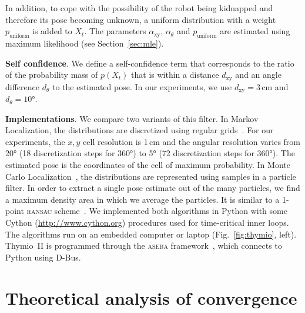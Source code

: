 \documentclass{svmult}
\newcommand{\fig}[1]{Fig.~\ref{fig:#1}}
\newcommand{\sect}[1]{Section~\ref{sec:#1}}
\begin{document}
In addition, to cope with the possibility of the robot being kidnapped and therefore its pose becoming unknown, a uniform distribution with a weight $p_\mathrm{uniform}$ is added to $X_t$.
The parameters $\alpha_\mathrm{xy}$, $\alpha_\theta$ and $p_\mathrm{uniform}$ are estimated using maximum likelihood (see \sect{mle}).


\textbf{Self confidence}. We define a self-confidence term that corresponds to the ratio of the probability mass of $p(X_t)$ that is within a distance $d_\mathrm{xy}$ and an angle difference $d_\theta$ to the estimated pose.
In our experiments, we use $d_\mathrm{xy} = 3$\,cm and $d_\theta = 10$°.


\textbf{Implementations}.
We compare two variants of this filter.
In Markov Localization, the distributions are discretized using regular grids~\cite{fox1999markov}.
For our experiments, the $x,y$ cell resolution is 1\,cm and the angular resolution varies from 20° (18 discretization steps for 360°) to 5° (72 discretization steps for 360°).
The estimated pose is the coordinates of the cell of maximum probability.
In Monte Carlo Localization~\cite{dellaert1999monte}, the distributions are represented using samples in a particle filter.
In order to extract a single pose estimate out of the many particles, we find a maximum density area in which we average the particles.
It is similar to a 1-point \textsc{ransac} scheme~\cite{Fischler1981ransac}.
We implemented both algorithms in Python with some Cython (\url{http://www.cython.org}) procedures used for time-critical inner loops.
The algorithms run on an embedded computer or laptop (\fig{thymio}, left).
Thymio~II is programmed through the \textsc{aseba} framework~\cite{aseba2011tmech}, which connects to Python using D-Bus.

\section{Theoretical analysis of convergence}
\label{sec:theoreticalconv}
\end{document}
